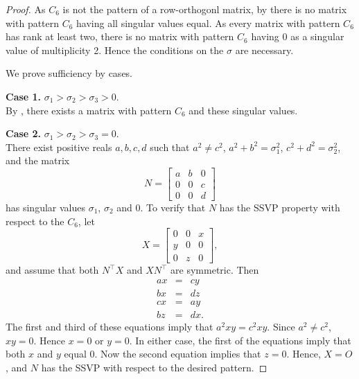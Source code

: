 \documentclass[preprint,12pt]{elsarticle}
\newcommand{\trans  }{^\top}
\begin{document}
\begin{proof}
As $C_6$ is not the pattern of a row-orthogonl matrix,
by  there is no matrix with pattern $C_6$
having all singular values equal. As every matrix with pattern $C_6$ has rank at least two, there is no matrix with pattern $C_6$ having $0$ as a singular value of multiplicity 2.  Hence the conditions on the $\sigma$ are necessary. 

\bigskip\noindent
We prove sufficiency by cases.

\bigskip\noindent
{\bf Case 1.} $ \sigma_1>\sigma_2> \sigma_3>0$. 
\\ 
By , there exists a matrix with pattern $C_6$ and these singular values.

\bigskip\noindent
{\bf Case 2.} $ \sigma_1>\sigma_2> \sigma_3=0$. 
\\ 
There exist positive reals $a, b, c, d$ such that 
 $a^2 \neq c^2$, $a^2+ b^2=\sigma_1^2$, $c^2+d^2=\sigma_2^2$, and  
the matrix 
\[ 
N= \left[ \begin{array}{ccc}
a & b & 0 \\
0 & 0 & c \\
0 & 0 & d 
\end{array}
\right] 
\]
has singular values $\sigma_1$, $\sigma_2$ and $0$. 
To verify that  $N$ has the SSVP property with respect 
to the $C_6$,
let 
\[ 
X=\left[\begin{array}{ccc}
0& 0 & x\\ 
y & 0 & 0\\
0 & z & 0
\end{array} 
\right],
\]
and assume that both $N\trans X$ and $X N\trans$ are symmetric. 
Then 
\begin{eqnarray*}
ax&=&cy\\ 
bx&=&dz\\ 
cx&=&ay\\
bz&=&dx.
\end{eqnarray*}
The first and third of these equations imply that $a^2xy=c^2xy$.
Since $a^2\neq c^2$, $xy=0$. Hence $x=0$ or $y=0$. In either case, 
the first of the equations imply that both $x$ and $y$ equal $0$. 
Now the second equation implies that $z=0$.  Hence, $X=O$, and 
$N$ has the SSVP with respect to the desired pattern. 



\end{proof}
\end{document}
